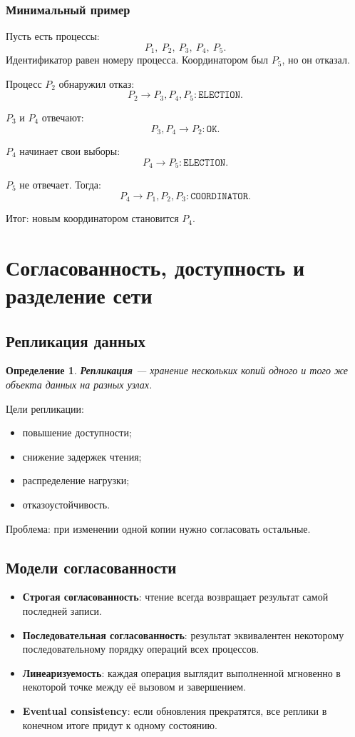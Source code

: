 \documentclass[12pt,a4paper]{article}
\newtheorem{definition}{Определение}
\begin{document}
\subsubsection{Минимальный пример}

Пусть есть процессы:
\[
P_1,\ P_2,\ P_3,\ P_4,\ P_5.
\]
Идентификатор равен номеру процесса. Координатором был $P_5$, но он отказал.

Процесс $P_2$ обнаружил отказ:
\[
P_2 \rightarrow P_3,P_4,P_5: \texttt{ELECTION}.
\]

$P_3$ и $P_4$ отвечают:
\[
P_3,P_4 \rightarrow P_2: \texttt{OK}.
\]

$P_4$ начинает свои выборы:
\[
P_4 \rightarrow P_5: \texttt{ELECTION}.
\]

$P_5$ не отвечает. Тогда:
\[
P_4 \rightarrow P_1,P_2,P_3: \texttt{COORDINATOR}.
\]

Итог: новым координатором становится $P_4$.

\section{Согласованность, доступность и разделение сети}

\subsection{Репликация данных}

\begin{definition}
\textbf{Репликация} --- хранение нескольких копий одного и того же объекта данных на разных узлах.
\end{definition}

Цели репликации:
\begin{itemize}
    \item повышение доступности;
    \item снижение задержек чтения;
    \item распределение нагрузки;
    \item отказоустойчивость.
\end{itemize}

Проблема: при изменении одной копии нужно согласовать остальные.

\subsection{Модели согласованности}

\begin{itemize}
    \item \textbf{Строгая согласованность}: чтение всегда возвращает результат самой последней записи.
    \item \textbf{Последовательная согласованность}: результат эквивалентен некоторому последовательному порядку операций всех процессов.
    \item \textbf{Линеаризуемость}: каждая операция выглядит выполненной мгновенно в некоторой точке между её вызовом и завершением.
    \item \textbf{Eventual consistency}: если обновления прекратятся, все реплики в конечном итоге придут к одному состоянию.
\end{itemize}
\end{document}
